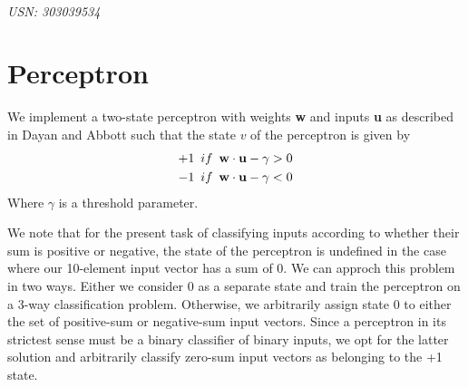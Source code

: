 \documentclass{article}
\begin{document}

\begin{center}
\textbf{\LARGE{}}\\

\textit{USN: 303039534}\\
\end{center}

\section{Perceptron}

We implement a two-state perceptron with weights \textbf{w} and inputs \textbf{u} as described in Dayan and Abbott such that the state $v$ of the perceptron is given by
\begin{equation}
\begin{split}
+1 \,\,\, if \,\,\,  {\bf w \cdot u} - \gamma > 0 \\
-1 \,\,\, if \,\,\,  {\bf w \cdot u} - \gamma < 0
\end{split}
\end{equation}
Where $\gamma$ is a threshold parameter.

We note that for the present task of classifying inputs according to whether their sum is positive or negative, the state of the perceptron is undefined in the case where our 10-element input vector has a sum of 0.
We can approch this problem in two ways. Either we consider 0 as a separate state and train the perceptron on a 3-way classification problem. Otherwise, we arbitrarily assign state 0 to either the set of positive-sum or negative-sum input vectors. Since a perceptron in its strictest sense must be a binary classifier of binary inputs, we opt for the latter solution and arbitrarily classify zero-sum input vectors as belonging to the +1 state.
\end{document}
